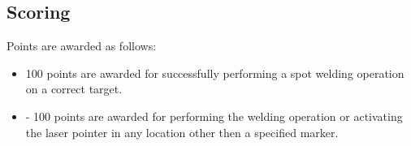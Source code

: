 \subsection{Scoring}
Points are awarded as follows:

\begin{itemize}
\item 100 points are awarded for successfully performing a spot welding operation on a correct target.
\item - 100 points are awarded for performing the welding operation or activating the laser pointer in any location other then a specified marker.

\end{itemize}


